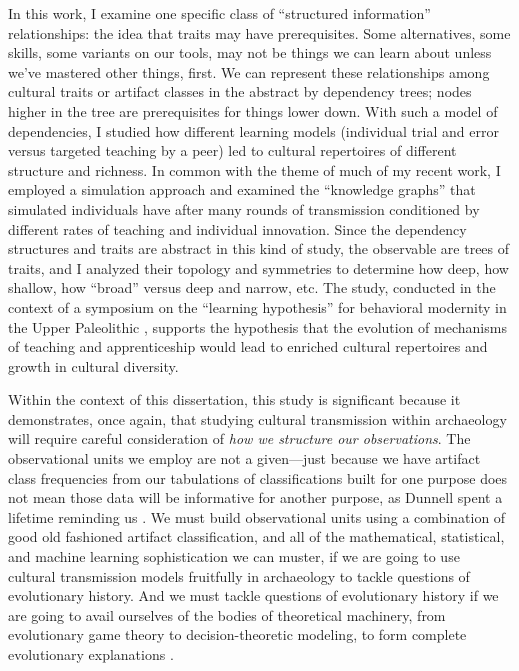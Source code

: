 In this work, I examine one specific class of ``structured information'' relationships:  the idea that traits may have prerequisites.  Some alternatives, some skills, some variants on our tools, may not be things we can learn about unless we've mastered other things, first.  We can represent these relationships among cultural traits or artifact classes in the abstract by dependency trees; nodes higher in the tree are prerequisites for things lower down.  With such a model of dependencies, I studied how different learning models (individual trial and error versus targeted teaching by a peer) led to cultural repertoires of different structure and richness.  In common with the theme of much of my recent work, I employed a simulation approach and examined the ``knowledge graphs'' that simulated individuals have after many rounds of transmission conditioned by different rates of teaching and individual innovation.  Since the dependency structures and traits are abstract in this kind of study, the observable are trees of traits, and I analyzed their topology and symmetries to determine how deep, how shallow, how ``broad'' versus deep and narrow, etc.  The study, conducted in the context of a symposium on the ``learning hypothesis'' for behavioral modernity in the Upper Paleolithic \citep{Nishiaki2013}, supports the hypothesis that the evolution of mechanisms of teaching and apprenticeship would lead to enriched cultural repertoires and growth in cultural diversity.

Within the context of this dissertation, this study is significant because it demonstrates, once again, that studying cultural transmission within archaeology will require careful consideration of \emph{how we structure our observations}.  The observational units we employ are not a given---just because we have artifact class frequencies from our tabulations of classifications built for one purpose does not mean those data will be informative for another purpose, as Dunnell spent a lifetime reminding us \citep{Dunnell1971,dunnell1986methodological}.  We must build observational units using a combination of good old fashioned artifact classification, and all of the mathematical, statistical, and machine learning sophistication we can muster, if we are going to use cultural transmission models fruitfully in archaeology to tackle questions of evolutionary history.  And we must tackle questions of evolutionary history if we are going to avail ourselves of the bodies of theoretical machinery, from evolutionary game theory to decision-theoretic modeling, to form complete evolutionary explanations .